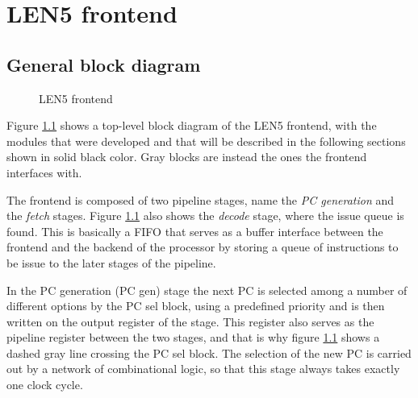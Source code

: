 \chapter{LEN5 frontend}
\section{General block diagram}
\begin{figure}[hbt]
  \centering
  \caption{LEN5 frontend}
  \label{fig:frontend}
\end{figure}
Figure \ref{fig:frontend} shows a top-level block diagram of the LEN5 frontend, with the modules that were developed and that will be described in the following sections shown in solid black color. Gray blocks are instead the ones the frontend interfaces with.

The frontend is composed of two pipeline stages, name the \emph{\ac{PC} generation} and the \emph{fetch} stages. Figure \ref{fig:frontend} also shows the \emph{decode} stage, where the issue queue is found. This is basically a \acs{FIFO} that serves as a buffer interface between the frontend and the backend of the processor by storing a queue of instructions to be issue to the later stages of the pipeline.

In the \ac{PC} generation (\ac{PC} gen) stage the next \ac{PC} is selected among a number of different options by the \ac{PC} sel block, using a predefined priority and is then written on the output register of the stage. This register also serves as the pipeline register between the two stages, and that is why figure \ref{fig:frontend} shows a dashed gray line crossing the \ac{PC} sel block. The selection of the new \ac{PC} is carried out by a network of combinational logic, so that this stage always takes exactly one clock cycle.


